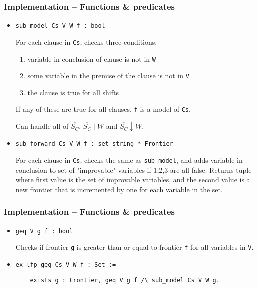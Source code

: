 \documentclass[slides]{beamer}
\begin{document}
\begin{frame}[fragile]
    \frametitle{Implementation – Functions \& predicates}

    \begin{itemize}
        \item \begin{minipage}{\linewidth}\lstinline{sub_model Cs V W f : bool}\end{minipage}
            For each clause in \lstinline{Cs}, checks three conditions:
            \begin{enumerate}
                \item
                    variable in conclusion of clause is not in \lstinline{W}
                \item
                    some variable in the premise of the clause is not in \lstinline{V}
                \item
                    the clause is true for all shifts
            \end{enumerate}
            If any of these are true for all clauses, \lstinline{f} is a model of \lstinline{Cs}.

            Can handle all of $\overline{S_C}$, $\overline{S_C}\mid W$ and $\overline{S_C}\downarrow W$.
        \item \begin{minipage}{\linewidth}\lstinline{sub_forward Cs V W f : set string * Frontier}\end{minipage}
            For each clause in \lstinline{Cs}, checks the same as \lstinline{sub_model},
            and adds variable in conclusion to set of "improvable" variables if 1,2,3 are all false.
            Returns tuple where first value is the set of improvable variables,
            and the second value is a new frontier that is incremented by one for each variable in the set.
    \end{itemize}
\end{frame}

\begin{frame}[fragile]
    \frametitle{Implementation – Functions \& predicates}

    \begin{itemize}
        \item \begin{minipage}{\linewidth}\lstinline{geq V g f : bool}\end{minipage}
            Checks if frontier \lstinline{g} is greater than or equal to frontier \lstinline{f} for all variables in \lstinline{V}.
        \item \begin{minipage}{\linewidth}\lstinline{ex_lfp_geq Cs V W f : Set :=}\end{minipage}
              \begin{minipage}{\linewidth}\lstinline{    exists g : Frontier, geq V g f /\ sub_model Cs V W g.}\end{minipage}
    \end{itemize}
\end{frame}
\end{document}
